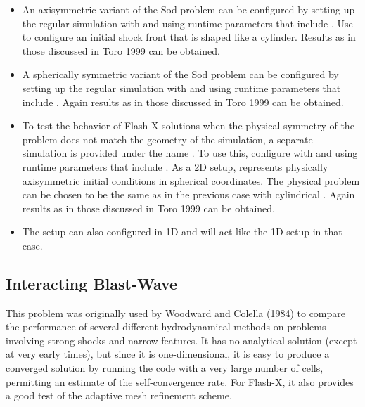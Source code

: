 \begin{itemize}
\item
An axisymmetric variant of the Sod problem can be configured by
setting up the regular  simulation with 
 and using runtime parameters
that include . 
Use 
to configure an initial shock front that is shaped like a cylinder.
Results as in those discussed in Toro 1999 can be obtained.
\item
A spherically symmetric variant of the Sod problem can be configured by
setting up the regular  simulation with 
 and using runtime parameters
that include .
Again results as in those discussed in Toro 1999 can be obtained.
\item
To test the behavior of Flash-X solutions when the physical symmetry of the
problem does not match the geometry of the simulation,
a separate simulation is provided under the name .
To use this, configure with 
 and using runtime parameters
that include .
As a 2D setup,  represents physically axisymmetric
initial conditions in spherical coordinates. The physical problem
can be chosen to be the same as in the previous case with cylindrical .
Again results as in those discussed in Toro 1999 can be obtained.
\item
The  setup can also configured in 1D and will act
like the 1D  setup in that case.
\end{itemize}


\subsection{Interacting Blast-Wave }
\label{Sec:SimulationBlast2}

This  problem was originally used by Woodward and Colella (1984) to
compare the performance of several different hydrodynamical methods
on problems involving strong shocks and narrow features. It has no analytical
solution (except at very early times), but since it is one-dimensional, it
is easy to produce a converged solution by running the code with a very large
number of cells,
permitting an estimate of the self-convergence rate.
For Flash-X, it also provides a
good test of the adaptive mesh refinement scheme.

